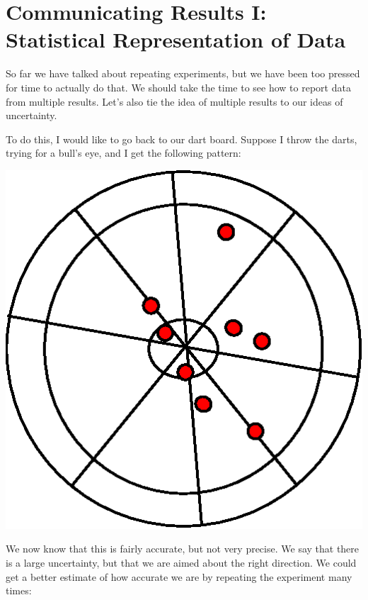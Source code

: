 \documentclass[twoside,11pt,ShortChapTitles]{BYUTextbook}
\begin{document}
\chapter[Statistical Representation of Data]{Communicating Results I: Statistical Representation of Data}

So far we have talked about repeating experiments, but we have been too
pressed for time to actually do that. We should take the time to see how to
report data from multiple results. Let's also tie the idea of multiple
results to our ideas of uncertainty.

To do this, I would like to go back to our dart board. Suppose I throw the
darts, trying for a bull's eye, and I get the following pattern:

\begin{center}
\includegraphics[scale=0.5]{Lab2_figs/bullseye_few.eps}
\end{center}

We now know that this is fairly accurate, but not very precise. We say that
there is a large uncertainty, but that we are aimed about the right
direction. We could get a better estimate of how accurate we are by
repeating the experiment many times:
\end{document}
